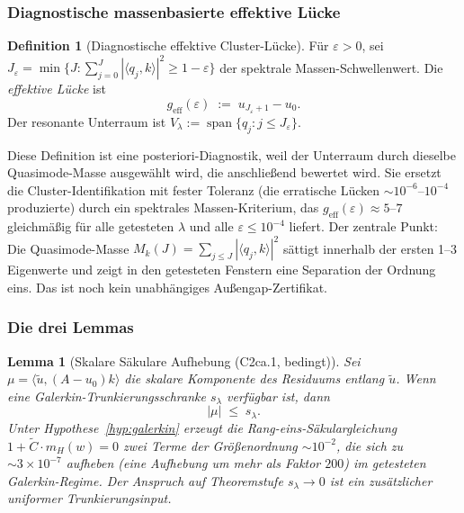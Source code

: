 \documentclass[11pt,a4paper]{article}
\theoremstyle{plain}
\newtheorem{lemma}[theorem]{Lemma}
\theoremstyle{definition}
\newtheorem{definition}[theorem]{Definition}
\begin{document}
\subsubsection{Diagnostische massenbasierte effektive Lücke}

\begin{definition}[Diagnostische effektive Cluster-Lücke]\label{def:geff}
Für $\varepsilon > 0$, sei $J_\varepsilon = \min\{J :
\sum_{j=0}^{J} |\langle q_j, k\rangle|^2 \geq 1 - \varepsilon\}$
der spektrale Massen-Schwellenwert. Die \emph{effektive Lücke} ist
\[
  g_{\mathrm{eff}}(\varepsilon) \;:=\; u_{J_\varepsilon + 1} - u_0.
\]
Der resonante Unterraum ist $V_\lambda := \operatorname{span}\{q_j : j \leq J_\varepsilon\}$.
\end{definition}

Diese Definition ist eine posteriori-Diagnostik, weil der Unterraum durch
dieselbe Quasimode-Masse ausgewählt wird, die anschließend bewertet wird.
Sie ersetzt die Cluster-Identifikation mit fester Toleranz
(die erratische Lücken $\sim 10^{-6}$--$10^{-4}$ produzierte) durch ein
spektrales Massen-Kriterium, das $g_{\mathrm{eff}}(\varepsilon) \approx 5$--$7$
gleichmäßig für alle getesteten $\lambda$ und alle $\varepsilon \leq 10^{-4}$ liefert.
Der zentrale Punkt: Die Quasimode-Masse $M_k(J) = \sum_{j \leq J} |\langle q_j, k\rangle|^2$
sättigt innerhalb der ersten 1--3 Eigenwerte und zeigt in den getesteten
Fenstern eine Separation der Ordnung eins. Das ist noch kein unabhängiges
Außengap-Zertifikat.

\subsubsection{Die drei Lemmas}

\begin{lemma}[Skalare Säkulare Aufhebung (C2ca.1, bedingt)]
\label{lem:secular}
Sei $\mu = \langle \tilde{u}, (A-u_0)k\rangle$ die skalare
Komponente des Residuums entlang $\tilde{u}$. Wenn eine
Galerkin-Trunkierungsschranke $s_\lambda$ verfügbar ist, dann
\[
  |\mu| \;\leq\; s_\lambda .
\]
Unter Hypothese~\ref{hyp:galerkin} erzeugt die Rang-eins-Säkulargleichung
$1 + \tilde{C} \cdot m_H(w) = 0$ zwei Terme der Größenordnung $\sim 10^{-2}$, die sich zu
$\sim 3 \times 10^{-7}$ aufheben (eine Aufhebung um mehr als Faktor $200$)
im getesteten Galerkin-Regime. Der Anspruch auf Theoremstufe $s_\lambda\to0$ ist
ein zusätzlicher uniformer Trunkierungsinput.
\end{lemma}
\end{document}
